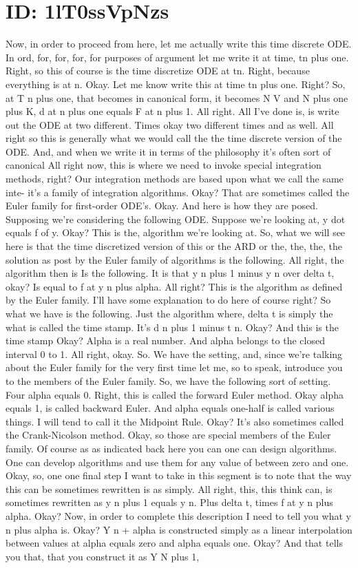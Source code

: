 \documentclass[10pt]{article}
\begin{document}
\section*{ID: 1lT0ssVpNzs}
Now, in order to proceed from here, let me actually write this time discrete ODE. In ord, for, for, for, for purposes of argument let me write it at time, tn plus one. Right, so this of course is the time discretize ODE at tn. Right, because everything is at n. Okay. Let me know write this at time tn plus one. Right? So, at T n plus one, that becomes in canonical form, it becomes N V and N plus one plus K, d at n plus one equals F at n plus 1. All right. All I've done is, is write out the ODE at two different. Times okay two different times and as well. All right so this is generally what we would call the the time discrete version of the ODE. And, and when we write it in terms of the philosophy it's often sort of canonical All right now, this is where we need to invoke special integration methods, right? Our integration methods are based upon what we call the same inte- it's a family of integration algorithms. Okay? That are sometimes called the Euler family for first-order ODE's. Okay. And here is how they are posed. Supposing we're considering the following ODE. Suppose we're looking at, y dot equals f of y. Okay? This is the, algorithm we're looking at. So, what we will see here is that the time discretized version of this or the ARD or the, the, the, the solution as post by the Euler family of algorithms is the following. All right, the algorithm then is Is the following. It is that y n plus 1 minus y n over delta t, okay? Is equal to f at y n plus alpha. All right? This is the algorithm as defined by the Euler family. I'll have some explanation to do here of course right? So what we have is the following. Just the algorithm where, delta t is simply the what is called the time stamp. It's d n plus 1 minus t n. Okay? And this is the time stamp Okay? Alpha is a real number. And alpha belongs to the closed interval 0 to 1. All right, okay. So. We have the setting, and, since we're talking about the Euler family for the very first time let me, so to speak, introduce you to the members of the Euler family. So, we have the following sort of setting. Four alpha equals 0. Right, this is called the forward Euler method. Okay alpha equals 1, is called backward Euler. And alpha equals one-half is called various things. I will tend to call it the Midpoint Rule. Okay? It's also sometimes called the Crank-Nicolson method. Okay, so those are special members of the Euler family. Of course as as indicated back here you can one can design algorithms. One can develop algorithms and use them for any value of between zero and one. Okay, so, one one final step I want to take in this segment is to note that the way this can be sometimes rewritten is as simply. All right, this, this think can, is sometimes rewritten as y n plus 1 equals y n. Plus delta t, times f at y n plus alpha. Okay? Now, in order to complete this description I need to tell you what y n plus alpha is. Okay? Y n + alpha is constructed simply as a linear interpolation between values at alpha equals zero and alpha equals one. Okay? And that tells you that, that you construct it as Y N plus 1, 
\end{document}

